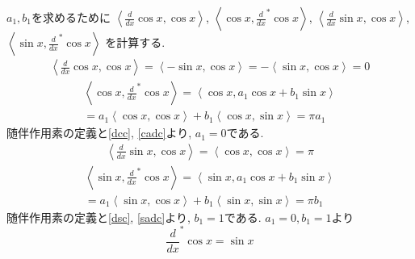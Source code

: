 \documentclass[a4paper,11pt]{jsarticle}
\begin{document}
$a_1, b_1$を求めるために 
$\left<\frac{d}{dx}\cos{x}, \cos{x}\right>$,
$\left<\cos{x}, \frac{d}{dx}^*\cos{x}\right>$,
$\left<\frac{d}{dx}\sin{x}, \cos{x}\right>$,
$\left<\sin{x}, \frac{d}{dx}^*\cos{x}\right>$
を計算する.
\begin{eqnarray}
  \left<\frac{d}{dx}\cos{x}, \cos{x}\right>
  = \left<-\sin{x}, \cos{x}\right>
  = -\left<\sin{x}, \cos{x}\right>
  = 0 \label{dcc}
\end{eqnarray}
\begin{equation}
  \begin{split}
    \left<\cos{x}, \frac{d}{dx}^*\cos{x}\right>
    = \left<\cos{x}, a_1\cos{x} + b_1\sin{x}\right> \\
    = a_1\left<\cos{x}, \cos{x}\right> + b_1\left<\cos{x}, \sin{x}\right>
    = \pi a_1
  \end{split}
  \label{cadc}
\end{equation}
随伴作用素の定義と\eqref{dcc}, \eqref{cadc}より, $a_1=0$である.
\begin{eqnarray}
  \left<\frac{d}{dx}\sin{x}, \cos{x}\right>
  = \left<\cos{x}, \cos{x}\right>
  = \pi \label{dsc}
\end{eqnarray}
\begin{equation}
  \begin{split}
    \left<\sin{x}, \frac{d}{dx}^*\cos{x}\right>
    = \left<\sin{x}, a_1\cos{x} + b_1\sin{x}\right> \\
    = a_1\left<\sin{x}, \cos{x}\right> + b_1\left<\sin{x}, \sin{x}\right>
    = \pi b_1
  \end{split}
  \label{sadc}
\end{equation}
随伴作用素の定義と\eqref{dsc}, \eqref{sadc}より, $b_1=1$である.
$a_1 = 0, b_1 = 1$より
\[
  \frac{d}{dx}^*\cos{x} = \sin{x}
\]
\end{document}
